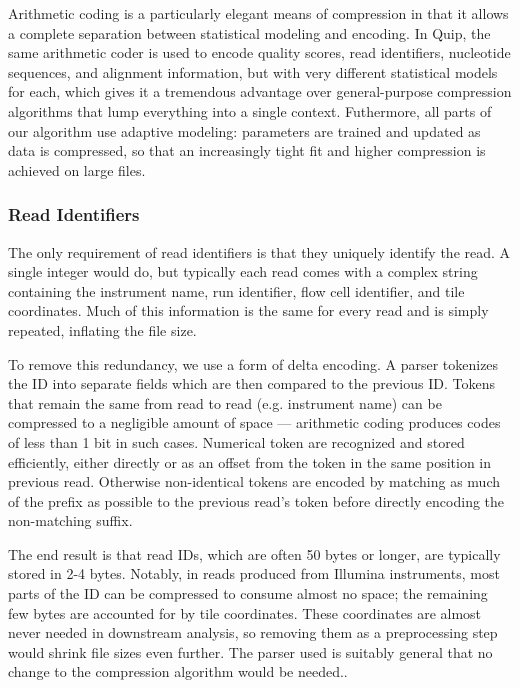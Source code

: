 \documentclass[a4,center,fleqn]{NAR}
\begin{document}
Arithmetic coding is a particularly elegant means of compression in that it
allows a complete separation between statistical modeling and encoding. In
Quip, the same arithmetic coder is used to encode quality scores, read
identifiers, nucleotide sequences, and alignment information, but with very
different statistical models for each, which gives it a tremendous advantage
over general-purpose compression algorithms that lump everything into a
single context. Futhermore, all parts of our algorithm use adaptive modeling:
parameters are trained and updated as data is compressed, so that an
increasingly tight fit and higher compression is achieved on large files.


\subsubsection{Read Identifiers}

The only requirement of read identifiers is that they uniquely identify the
read. A single integer would do, but typically each read comes with a complex
string containing the instrument name, run identifier, flow cell identifier,
and tile coordinates. Much of this information is the same for every read and
is simply repeated, inflating the file size.

To remove this redundancy, we use a form of delta encoding. A  parser
tokenizes the ID into separate fields which are then compared to the previous
ID. Tokens that remain the same from read to read (e.g. instrument name)
can be compressed to a negligible amount of space --- arithmetic coding produces
codes of less than 1 bit in such cases. Numerical token are recognized and
stored efficiently, either directly or as an offset from the token in the same
position in previous read. Otherwise non-identical tokens are encoded by
matching as much of the prefix as possible to the previous read's token before
directly encoding the non-matching suffix.

The end result is that read IDs, which are often 50 bytes or longer, are
typically stored in 2-4 bytes. Notably, in reads produced from Illumina
instruments, most parts of the ID can be compressed to consume almost no
space; the remaining few bytes are accounted for by tile coordinates. These
coordinates are almost never needed in downstream analysis, so removing them
as a preprocessing step would shrink file sizes even further. The parser used
is suitably general that no change to the compression algorithm would be
needed..
\end{document}
